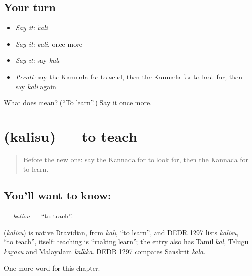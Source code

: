 \subsection*{Your turn}
\begin{itemize}
\raggedright
  \item \emph{Say it:} \emph{kali}
  \item \emph{Say it:} \emph{kali}, once more
  \item \emph{Say it:} say \emph{kali}
  \item \emph{Recall:} say the Kannada for to send, then the Kannada for to look for, then say \emph{kali} again
\end{itemize}

\begin{tcolorbox}[breakable,colback=teal!4,colframe=teal!35!black,title={Before you move on}]
What does  mean? (\textquotedblleft{}To learn\textquotedblright{}.) Say it once more.
\end{tcolorbox}
\section[\texorpdfstring{\kn{ಕಲಿಸು} (kalisu)}{ಕಲಿಸು (kalisu)}]{ (kalisu) — to teach}

\label{lesson:KA-C148-kalisu2}



\begin{quote}
Before the new one: say the Kannada for to look for, then the Kannada for to learn.
\end{quote}

\subsection*{You'll want to know: }
\textbf{} — \emph{kalisu} — \textquotedblleft{}to teach\textquotedblright{}.

\begin{cousinweb}
\textbf{} (\emph{kalisu}) is native Dravidian, from \emph{kali}, \textquotedblleft{}to learn\textquotedblright{}, and DEDR 1297 lists \emph{kalisu}, \textquotedblleft{}to teach\textquotedblright{}, itself: teaching is \textquotedblleft{}making learn\textquotedblright{}; the entry also has Tamil \emph{kal}, Telugu \emph{kaṟacu} and Malayalam \emph{kalkka}. DEDR 1297 compares Sanskrit \emph{kalā}.
\end{cousinweb}

\begin{grammarlens}[title={What you've built}]
One more word for this chapter.
\end{grammarlens}

